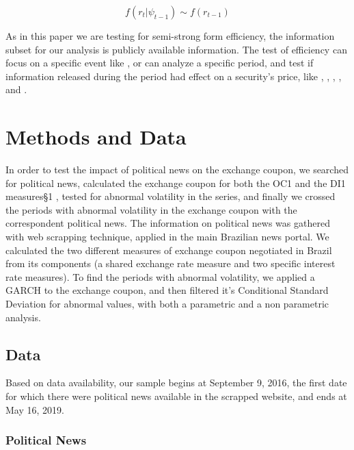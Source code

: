 \documentclass[cic,tc, english]{iiufrgs}
\begin{document}
    \begin{equation}
        \label{eqn:efficient}
        f ( r_t | \psi_{t-1} ) \sim f(r_{t-1})
    \end{equation}

    As in this paper we are testing for semi-strong form efficiency, the information subset for our analysis is publicly available information. The test of efficiency can focus on a specific event like \citet{gabrielribeiro2013}, or can analyze a specific period, and test if information released during the period had effect on a security's price, like \citet{caporaleetal2015}, \citet{mcqueenroley1993}, \citet{larsenthorsrud2017}, \citet{moussaetal2017}, \citet{smales2015} and \citet{marquessantos2016}.


\chapter{Methods and Data} \label{chapter_methods_data}

    In order to test the impact of political news on the exchange coupon, we searched for political news, calculated the exchange coupon for both the OC1 and the DI1 measures§1 , tested for abnormal volatility in the series, and finally we crossed the periods with abnormal volatility in the exchange coupon with the correspondent political news. The information on political news was gathered with web scrapping technique, applied in the main Brazilian news portal. We calculated the two different measures of exchange coupon negotiated in Brazil from its components (a shared exchange rate measure and two specific interest rate measures). To find the periods with abnormal volatility, we applied a GARCH to the exchange coupon, and then filtered it's Conditional Standard Deviation for abnormal values, with both a parametric and a non parametric analysis.

\section{Data} \label{chapter_data}

    Based on data availability, our sample begins at September 9, 2016, the first date for which there were political news available in the scrapped website, and ends at May 16, 2019.

\subsection{Political News} \label{chapter_political_news}
    
\end{document}

